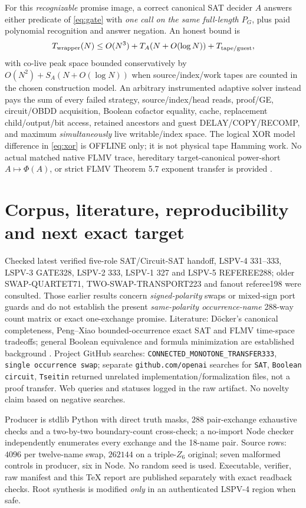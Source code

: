 \documentclass[11pt]{article}
\begin{document}
For this \emph{recognizable} promise image, a correct canonical SAT decider $A$ answers either predicate of \eqref{eq:gate} with \emph{one call on the same full-length $P_G$}, plus paid polynomial recognition and answer negation. An honest bound is
\[
 T_{\rm wrapper}(N)\le O(N^3)+T_A(N+O(\log N))+T_{\rm tape/guest},
\]
with co-live peak space bounded conservatively by $O(N^2)+S_A(N+O(\log N))$ when source/index/work tapes are counted in the chosen construction model. An arbitrary instrumented adaptive solver instead pays the sum of every failed strategy, source/index/head reads, proof/GE, circuit/OBDD acquisition, Boolean cofactor equality, cache, replacement child/output/bit access, retained ancestors and guest DELAY/COPY/RECOMP, and maximum \emph{simultaneously} live writable/index space. The logical XOR model difference in \eqref{eq:xor} is OFFLINE only; it is not physical tape Hamming work. No actual matched native FLMV trace, hereditary target-canonical power-short $A\mapsto\Phi(A)$, or strict FLMV Theorem 5.7 exponent transfer is provided \cite{flmv2005}.

\section{Corpus, literature, reproducibility and next exact target}
Checked latest verified five-role SAT/Circuit-SAT handoff, LSPV-4 331--333, LSPV-3 GATE328, LSPV-2 333, LSPV-1 327 and LSPV-5 REFEREE288; older SWAP-QUARTET71, TWO-SWAP-TRANSPORT223 and fanout referee198 were consulted. Those earlier results concern \emph{signed-polarity} swaps or mixed-sign port guards and do not establish the present \emph{same-polarity occurrence-name} 288-way count matrix or exact one-exchange promise. Literature: D\"ocker's canonical completeness, Peng--Xiao bounded-occurrence exact SAT and FLMV time-space tradeoffs; general Boolean equivalence and formula minimization are established background \cite{docker2019,pengxiao2023,flmv2005,calolevy2023}. Project GitHub searches: \texttt{CONNECTED\_MONOTONE\_TRANSFER333}, \texttt{single occurrence swap}; separate \texttt{github.com/openai} searches for \texttt{SAT}, \texttt{Boolean circuit}, \texttt{Tseitin} returned unrelated implementation/formalization files, not a proof transfer. Web queries and statuses logged in the raw artifact. No novelty claim based on negative searches.

Producer is stdlib Python with direct truth masks, 288 pair-exchange exhaustive checks and a two-by-two boundary-count cross-check; a no-import Node checker independently enumerates every exchange and the 18-name pair. Source rows: $4096$ per twelve-name swap, $262144$ on a triple-$Z_6$ original; seven malformed controls in producer, six in Node. No random seed is used. Executable, verifier, raw manifest and this TeX report are published separately with exact readback checks. Root synthesis is modified \emph{only} in an authenticated LSPV-4 region when safe.
\end{document}
